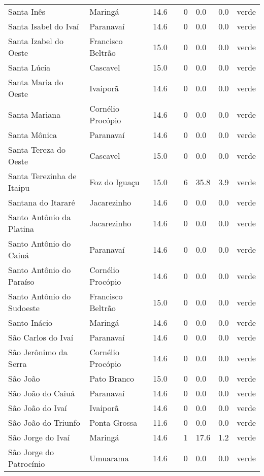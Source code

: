 \begin{longtable}{l|lllllll}
  Santa Inês & Maringá & 14.6 &  & 0 & 0.0 & 0.0 & verde \\ 
  Santa Isabel do Ivaí & Paranavaí & 14.6 &  & 0 & 0.0 & 0.0 & verde \\ 
  Santa Izabel do Oeste & Francisco Beltrão & 15.0 &  & 0 & 0.0 & 0.0 & verde \\ 
  Santa Lúcia & Cascavel & 15.0 &  & 0 & 0.0 & 0.0 & verde \\ 
  Santa Maria do Oeste & Ivaiporã & 14.6 &  & 0 & 0.0 & 0.0 & verde \\ 
  Santa Mariana & Cornélio Procópio & 14.6 &  & 0 & 0.0 & 0.0 & verde \\ 
  Santa Mônica & Paranavaí & 14.6 &  & 0 & 0.0 & 0.0 & verde \\ 
  Santa Tereza do Oeste & Cascavel & 15.0 &  & 0 & 0.0 & 0.0 & verde \\ 
  Santa Terezinha de Itaipu & Foz do Iguaçu & 15.0 &  & 6 & 35.8 & 3.9 & verde \\ 
  Santana do Itararé & Jacarezinho & 14.6 &  & 0 & 0.0 & 0.0 & verde \\ 
  Santo Antônio da Platina & Jacarezinho & 14.6 &  & 0 & 0.0 & 0.0 & verde \\ 
  Santo Antônio do Caiuá & Paranavaí & 14.6 &  & 0 & 0.0 & 0.0 & verde \\ 
  Santo Antônio do Paraíso & Cornélio Procópio & 14.6 &  & 0 & 0.0 & 0.0 & verde \\ 
  Santo Antônio do Sudoeste & Francisco Beltrão & 15.0 &  & 0 & 0.0 & 0.0 & verde \\ 
  Santo Inácio & Maringá & 14.6 &  & 0 & 0.0 & 0.0 & verde \\ 
  São Carlos do Ivaí & Paranavaí & 14.6 &  & 0 & 0.0 & 0.0 & verde \\ 
  São Jerônimo da Serra & Cornélio Procópio & 14.6 &  & 0 & 0.0 & 0.0 & verde \\ 
  São João & Pato Branco & 15.0 &  & 0 & 0.0 & 0.0 & verde \\ 
  São João do Caiuá & Paranavaí & 14.6 &  & 0 & 0.0 & 0.0 & verde \\ 
  São João do Ivaí & Ivaiporã & 14.6 &  & 0 & 0.0 & 0.0 & verde \\ 
  São João do Triunfo & Ponta Grossa & 11.6 &  & 0 & 0.0 & 0.0 & verde \\ 
  São Jorge do Ivaí & Maringá & 14.6 &  & 1 & 17.6 & 1.2 & verde \\ 
  São Jorge do Patrocínio & Umuarama & 14.6 &  & 0 & 0.0 & 0.0 & verde \\ 

\end{longtable}
